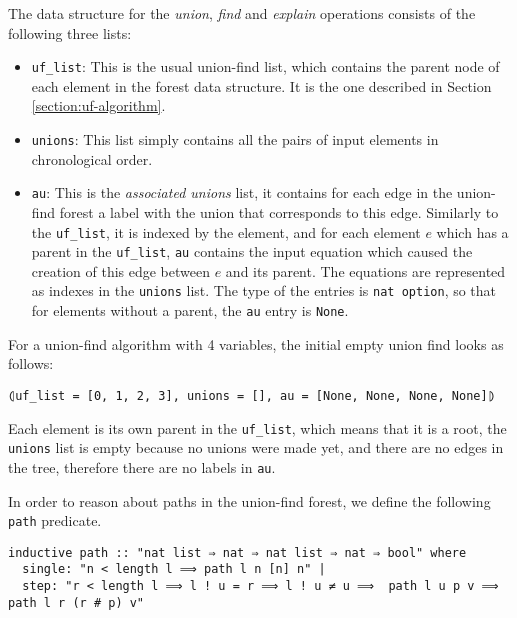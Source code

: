 The data structure for the \emph{union}, \emph{find} and \emph{explain} operations consists of the following three lists:

\begin{itemize}
	\item \lstinline{uf_list}: This is the usual union-find list, which contains the parent node of each element in the forest data structure. It is the one described in Section \ref{section:uf-algorithm}.

	\item \lstinline{unions}: This list simply contains all the pairs of input elements in chronological order.

	\item \lstinline{au}: This is the \emph{associated unions} list, it contains for each edge in the union-find forest a label with the union that corresponds to this edge. Similarly to the \lstinline{uf_list}, it is indexed by the element, and for each element $e$ which has a parent in the \lstinline{uf_list}, \lstinline{au} contains the input equation which caused the creation of this edge between $e$ and its parent. The equations are represented as indexes in the \lstinline{unions} list. The type of the entries is \lstinline{nat option}, so that for elements without a parent, the \lstinline{au} entry is \lstinline{None}.
\end{itemize}

\begin{exmp}\label{empty_ufe}
For a union-find algorithm with 4 variables, the initial empty union find looks as follows:
\begin{lstlisting}
⦇uf_list = [0, 1, 2, 3], unions = [], au = [None, None, None, None]⦈
\end{lstlisting}
Each element is its own parent in the \lstinline{uf_list}, which means that it is a root, the \lstinline{unions} list is empty because no unions were made yet, and there are no edges in the tree, therefore there are no labels in \lstinline{au}.
\end{exmp}

In order to reason about paths in the union-find forest, we define the following \lstinline{path} predicate.

\begin{lstlisting}
inductive path :: "nat list ⇒ nat ⇒ nat list ⇒ nat ⇒ bool" where
  single: "n < length l ⟹ path l n [n] n" |
  step: "r < length l ⟹ l ! u = r ⟹ l ! u ≠ u ⟹  path l u p v ⟹ path l r (r # p) v"
\end{lstlisting}

